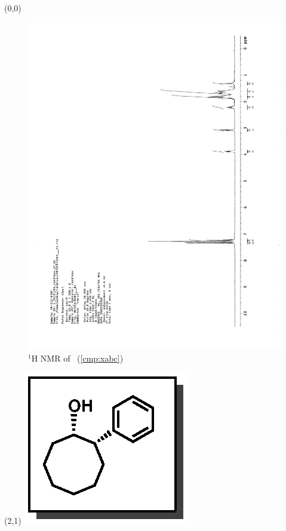 \begin{textblock}{20}(0,0)
\begin{figure}[htb]
\caption{$^1$H NMR of \CMPxaba\ (\ref{cmp:xabc})}
\includegraphics[scale=0.75, trim = 0mm 0mm 0mm 5mm,
clip]{chp_asymmetric/images/nmr/xabaH}
\vspace{-100pt}
\end{figure}
\end{textblock}
\begin{textblock}{1}(2,1)
\includegraphics[scale=0.8, angle=90]{chp_asymmetric/images/xaba}
\end{textblock}
